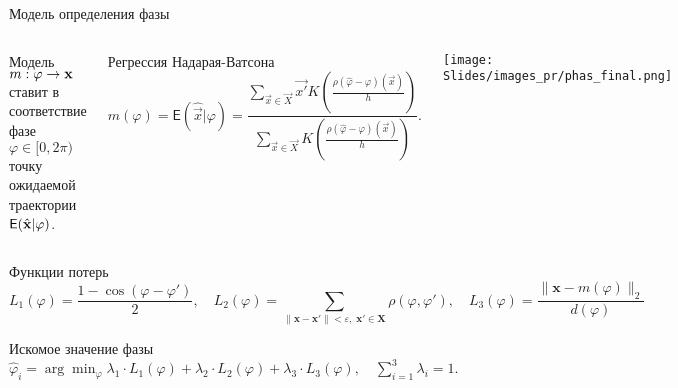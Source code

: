\documentclass[9pt]{beamer}
\begin{document}
\begin{frame}{Модель определения фазы}
\begin{columns}
  Модель $m: \varphi \rightarrow \mbox{\bfseries x}$ ставит в соответствие фазе $\varphi \in [0, 2\pi)$ точку ожидаемой траектории $\mathsf{E}(\hat{\mbox{\bfseries x}}|\varphi)$. 
\begin{block}{Регрессия Надарая-Ватсона}
\vspace{-0.3cm}
    \[ m(\varphi) = \mathsf{E}(\hat{\vec{x}}|\varphi) =\frac{\sum\limits_{\vec{x}\in \vec{X}}\vec{x'}K\left(\frac{\rho(\hat{\varphi} - \varphi)(\vec{x})}{h}\right)}{\sum\limits_{\vec{x}\in \vec{X}}K\left(\frac{\rho(\hat{\varphi} - \varphi)(\vec{x})}{h}\right)}.  \]
  \end{block}   
\vspace{-0.2cm}
\texttt{[image: Slides/images\_pr/phas\_final.png]}
\end{columns} 
\vspace{-0.4cm}
\begin{block}{Функции потерь}
\vspace{-0.3cm}
\[L_1(\varphi) =
        \frac{1-\cos(\varphi-\varphi')}{2},\quad L_2(\varphi) = 
    \sum_{\| \mathbf{x} - \mathbf{x'} \|<\varepsilon, \; \mathbf{x'} \in \mathbf{X}}\rho( \varphi, \varphi'), \quad L_3(\varphi) = \frac{\|\mathbf{x} - m(\varphi)\|_2}{d(\varphi)}\]
\end{block}
\vspace{-0.4cm}
\begin{block}{Искомое значение фазы}
\vspace{0.1cm}
$\widehat{\varphi}_i = \arg\min_{\varphi} \lambda_1\cdot L_1(\varphi) + \lambda_2 \cdot L_2(\varphi) + \lambda_3 \cdot L_3(\varphi), \quad \sum_{i=1}^{3} \lambda_i = 1.$
    
\end{block}

\end{frame}
\end{document}
